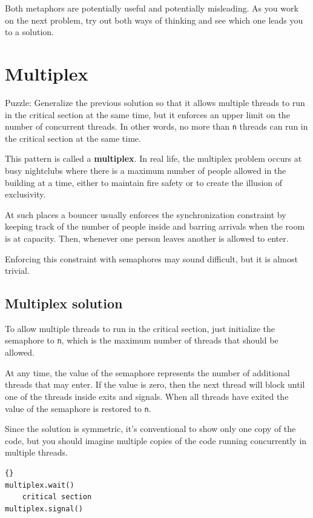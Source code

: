 \documentclass{book}
\newcommand{\clearemptydoublepage}{\newpage\cleardoublepage}
\begin{document}
Both metaphors are potentially useful and potentially misleading.
As you work on the next problem, try out both ways of thinking
and see which one leads you to a solution.


\section{Multiplex}

Puzzle: Generalize the previous solution so that it allows multiple
threads to run in the critical section at the same time, but it
enforces an upper limit on the number of concurrent threads.  In other
words, no more than {\tt n} threads can run in the critical section at
the same time.

This pattern is called a {\bf multiplex}.  In real life, the multiplex
problem occurs at busy nightclubs where there is a maximum number of
people allowed in the building at a time, either to maintain fire
safety or to create the illusion of exclusivity.

At such places a bouncer usually enforces the synchronization
constraint by keeping track of the number of people inside
and barring arrivals when the room is at capacity.  Then,
whenever one person leaves another is allowed to enter.

Enforcing this constraint with semaphores may sound difficult, but it
is almost trivial.


\clearemptydoublepage
\subsection{Multiplex solution}

To allow multiple threads to run in the critical section, just
initialize the semaphore to {\tt n}, which is the maximum number
of threads that should be allowed.

At any time, the value of the semaphore represents the
number of additional threads that may enter.  If the value is zero,
then the next thread will block until one of the threads inside
exits and signals.  When all threads have exited the value of the
semaphore is restored to {\tt n}.

Since the solution is symmetric, it's conventional to show only one
copy of the code, but you should imagine multiple copies of the code
running concurrently in multiple threads.

\begin{lstlisting}[title={Multiplex solution}]{}
multiplex.wait()
    critical section 
multiplex.signal()      
\end{lstlisting}
\end{document}
